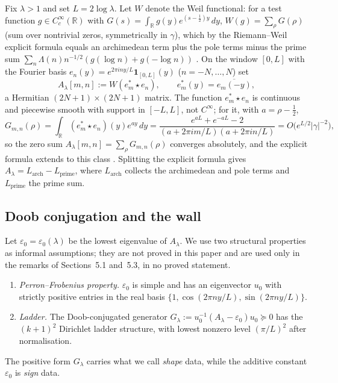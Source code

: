 \documentclass[11pt]{amsart}
\theoremstyle{definition}
\theoremstyle{remark}
\newcommand{\half}{\tfrac{1}{2}}
\newcommand{\gam}{\gamma}
\newcommand{\Lam}{\Lambda}
\newcommand{\eps}{\varepsilon}
\newcommand{\R}{\mathbb{R}}
\begin{document}
Fix $\lambda>1$ and set $L=2\log\lambda$. Let $W$ denote the Weil functional: for a test
function $g\in C_c^\infty(\R)$ with $G(s)=\int_\R g(y)e^{(s-\half)y}\,dy$, $W(g)=\sum_\rho G(\rho)$
(sum over nontrivial zeros, symmetrically in $\gam$), which by the Riemann--Weil explicit formula
equals an archimedean term plus the pole terms minus the prime sum
$\sum_n\Lam(n)n^{-1/2}(g(\log n)+g(-\log n))$ \cite{Weil,Bombieri}. On the window $[0,L]$ with
the Fourier basis $e_n(y)=e^{2\pi iny/L}\mathbf 1_{[0,L]}(y)$ ($n=-N,\dots,N$) set
\[
   A_\lambda[m,n]:=W(e_m^*\star e_n),\qquad e_m^*(y)=\overline{e_m(-y)},
\]
a Hermitian $(2N+1)\times(2N+1)$ matrix. The function $e_m^*\star e_n$ is continuous and
piecewise smooth with support in $[-L,L]$, not $C^\infty$; for it, with $a=\rho-\half$,
\begin{equation}\label{eq:Gmn}
   G_{m,n}(\rho)=\int_\R(e_m^*\star e_n)(y)e^{ay}\,dy
   =\frac{e^{aL}+e^{-aL}-2}{(a+2\pi im/L)(a+2\pi in/L)}=O\big(e^{L/2}|\gam|^{-2}\big),
\end{equation}
so the zero sum $A_\lambda[m,n]=\sum_\rho G_{m,n}(\rho)$ converges absolutely, and the explicit
formula extends to this class \cite{Bombieri}. Splitting the explicit formula gives
$A_\lambda=L_{\mathrm{arch}}-L_{\mathrm{prime}}$, where $L_{\mathrm{arch}}$ collects the
archimedean and pole terms and $L_{\mathrm{prime}}$ the prime sum.

\subsection{Doob conjugation and the wall}
Let $\eps_0=\eps_0(\lambda)$ be the lowest eigenvalue of $A_\lambda$. We use two structural
properties as informal assumptions; they are not proved in this paper and are used only in the
remarks of Sections~5.1 and~5.3, in no proved statement.
\begin{enumerate}[label=(H\arabic*)]
\item \emph{Perron--Frobenius property.} $\eps_0$ is simple and has an eigenvector $u_0$ with
strictly positive entries in the real basis $\{1,\cos(2\pi ny/L),\sin(2\pi ny/L)\}$.
\item \emph{Ladder.} The Doob-conjugated generator
$G_\lambda:=u_0^{-1}(A_\lambda-\eps_0)u_0\succeq0$ has the $(k+1)^2$ Dirichlet ladder structure,
with lowest nonzero level $(\pi/L)^2$ after normalisation.
\end{enumerate}
The positive form $G_\lambda$ carries what we call \emph{shape} data, while the additive constant
$\eps_0$ is \emph{sign} data.
\end{document}
